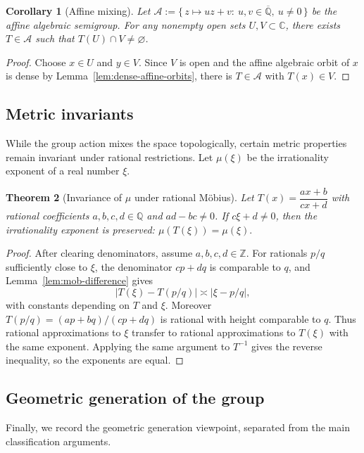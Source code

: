 \documentclass[11pt,a4paper]{article}
\theoremstyle{plain}
\newtheorem{theorem}{Theorem}[section]
\newtheorem{corollary}[theorem]{Corollary}
\theoremstyle{definition}
\newcommand{\C}{\mathbb{C}}
\newcommand{\Q}{\mathbb{Q}}
\newcommand{\Z}{\mathbb{Z}}
\newcommand{\Alg}{\overline{\mathbb{Q}}}
\begin{document}
\begin{corollary}[Affine mixing]\label{cor:affine-semigroup-transitive}
	Let $\mathcal A:=\{\,z\mapsto uz+v:\ u,v\in\Alg,\ u\ne0\,\}$ be the affine algebraic semigroup. For any nonempty open sets $U,V\subset\C$, there exists $T\in\mathcal A$ such that $T(U)\cap V\neq\varnothing$.
\end{corollary}
\begin{proof}
	Choose $x\in U$ and $y\in V$. Since $V$ is open and the affine algebraic orbit of $x$ is dense by Lemma~\ref{lem:dense-affine-orbits}, there is $T\in\mathcal A$ with $T(x)\in V$.
\end{proof}

\subsection{Metric invariants}

While the group action mixes the space topologically, certain metric properties remain invariant under rational restrictions. Let $\mu(\xi)$ be the irrationality exponent of a real number $\xi$.

\begin{theorem}[Invariance of $\mu$ under rational Möbius]\label{thm:irr-exp-invariance}
	Let $T(x)=\dfrac{ax+b}{cx+d}$ with rational coefficients $a,b,c,d\in\Q$ and $ad-bc\ne0$. If $c\xi+d\neq 0$, then the irrationality exponent is preserved:
	\(
	\mu(T(\xi))=\mu(\xi).
	\)
\end{theorem}
\begin{proof}
	After clearing denominators, assume $a,b,c,d\in\Z$. For rationals $p/q$ sufficiently close to $\xi$, the denominator $cp+dq$ is comparable to $q$, and Lemma~\ref{lem:mob-difference} gives
	\[
		\left|T(\xi)-T(p/q)\right|
		\asymp
		\left|\xi-p/q\right|,
	\]
	with constants depending on $T$ and $\xi$. Moreover $T(p/q)=(ap+bq)/(cp+dq)$ is rational with height comparable to $q$. Thus rational approximations to $\xi$ transfer to rational approximations to $T(\xi)$ with the same exponent. Applying the same argument to $T^{-1}$ gives the reverse inequality, so the exponents are equal.
\end{proof}

\subsection{Geometric generation of the group}

Finally, we record the geometric generation viewpoint, separated from the main classification arguments.
\end{document}
